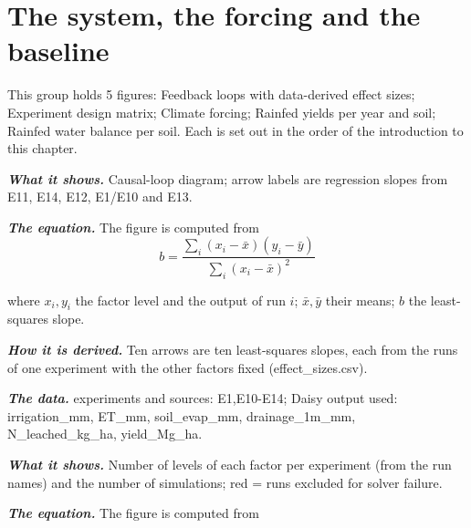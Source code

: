 \section{The system, the forcing and the baseline}
This group holds 5 figures: Feedback loops with data-derived effect sizes; Experiment design matrix; Climate forcing; Rainfed yields per year and soil; Rainfed water balance per soil. Each is set out in the order of the introduction to this chapter.
\par\vspace{6pt}\noindent{}\par\nobreak
{}\label{fig:a19_1}
\par\noindent\textbf{\color{khmag}\emph{What it shows.}} Causal-loop diagram; arrow labels are regression slopes from E11, E14, E12, E1/E10 and E13.
\par\noindent\textbf{\color{khmag}\emph{The equation.}} The figure is computed from
\begin{equation}\boxed{b=\dfrac{\sum_i (x_i-\bar x)(y_i-\bar y)}{\sum_i (x_i-\bar x)^2}}\end{equation}
\par\noindent where $x_i,y_i$ the factor level and the output of run $i$; $\bar x,\bar y$ their means; $b$ the least-squares slope.
\par\noindent\textbf{\color{khmag}\emph{How it is derived.}} Ten arrows are ten least-squares slopes, each from the runs of one experiment with the other factors fixed (effect\_sizes.csv).
\par\noindent\textbf{\color{khmag}\emph{The data.}} experiments and sources: E1,E10-E14; Daisy output used: irrigation\_mm, ET\_mm, soil\_evap\_mm, drainage\_1m\_mm, N\_leached\_kg\_ha, yield\_Mg\_ha.
\par\vspace{6pt}\noindent{}\par\nobreak
{}\label{fig:a19_2}
\par\noindent\textbf{\color{khmag}\emph{What it shows.}} Number of levels of each factor per experiment (from the run names) and the number of simulations; red = runs excluded for solver failure.
\par\noindent\textbf{\color{khmag}\emph{The equation.}} The figure is computed from
